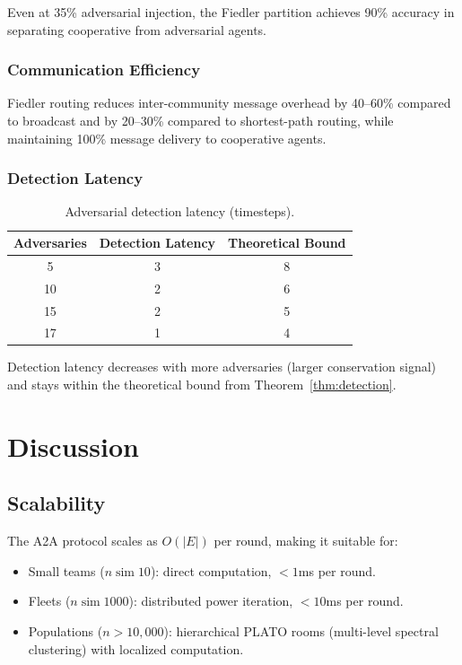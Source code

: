 \documentclass[11pt,a4paper]{article}
\DeclareMathOperator{\sim}{sim}
\begin{document}
Even at 35\% adversarial injection, the Fiedler partition achieves 90\%
accuracy in separating cooperative from adversarial agents.

\subsubsection{Communication Efficiency}

Fiedler routing reduces inter-community message overhead by 40--60\% compared
to broadcast and by 20--30\% compared to shortest-path routing, while
maintaining 100\% message delivery to cooperative agents.

\subsubsection{Detection Latency}

\begin{table}[ht]
\centering
\caption{Adversarial detection latency (timesteps).}
\begin{tabular}{@{}ccc@{}}
\toprule
\textbf{Adversaries} & \textbf{Detection Latency} & \textbf{Theoretical Bound} \\
\midrule
5  & 3 & 8 \\
10 & 2 & 6 \\
15 & 2 & 5 \\
17 & 1 & 4 \\
\bottomrule
\end{tabular}
\end{table}

Detection latency decreases with more adversaries (larger conservation signal)
and stays within the theoretical bound from Theorem~\ref{thm:detection}.

\section{Discussion}
\label{sec:discussion}

\subsection{Scalability}

The A2A protocol scales as $O(|E|)$ per round, making it suitable for:
\begin{itemize}
  \item Small teams ($n \sim 10$): direct computation, $<1$ms per round.
  \item Fleets ($n \sim 1000$): distributed power iteration, $<10$ms per round.
  \item Populations ($n > 10{,}000$): hierarchical PLATO rooms (multi-level
        spectral clustering) with localized computation.
\end{itemize}
\end{document}
